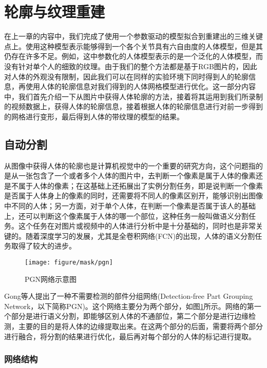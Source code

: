\newpage

\section{轮廓与纹理重建}

在上一章的内容中，我们完成了使用一个参数驱动的模型拟合到重建出的三维关键点上。使用这种模型表示能够得到一个各个关节具有六自由度的人体模型，但是其仍存在许多不足。例如，这中参数化的人体模型表示的是一个泛化的人体模型，而没有针对单个人的细致的纹理。由于我们的整个方法都是基于RGB图片的，因此对人体的外观没有限制，因此我们可以在同样的实验环境下同时得到人的轮廓信息，再使用人体的轮廓信息对我们得到的人体网格模型进行优化。这一部分内容中，我们首先介绍一下从图片中获得人体轮廓的方法，接着将其运用到我们所录制的视频数据上，获得人体的轮廓信息，接着根据人体的轮廓信息进行对前一步得到的网格进行变形，最后得到人体的带纹理的模型的结果。

\subsection{自动分割}
从图像中获得人体的轮廓也是计算机视觉中的一个重要的研究方向，这个问题指的是从一张包含了一个或者多个人体的图片中，去判断一个像素是属于人体的像素还是不属于人体的像素；在这基础上还拓展出了实例分割任务，即是说判断一个像素是否属于人体身上的像素的同时，还需要将不同人的像素区别开，能够识别出图像中不同的人体；另一方面，对于单个人体，在判断一个像素是否属于该人的基础上，还可以判断这个像素属于人体的哪一个部位，这种任务一般叫做语义分割任务。这个任务在对图片或视频中的人体进行分析中是十分基础的，同时也是非常关键的。随着深度学习的发展，尤其是全卷积网络(FCN)的出现，人体的语义分割任务取得了较大的进步。
\begin{figure}[htbp]
    \centering
    \texttt{[image: figure/mask/pgn]}
    \caption{\label{fig:pgn} PGN网络示意图\cite{cihppgn}}
\end{figure}
Gong等人\cite{cihppgn}提出了一种不需要检测的部件分组网络(Detection-free Part Grouping Network，以下简称PGN)。这个网络主要分为两个部分，如图\ref{fig:pgn}所示。网络的第一个部分是进行语义分割，即能够区别人体的不通部位，第二个部分是进行边缘检测，主要的目的是将人体的边缘提取出来。在这两个部分的后面，需要将两个部分进行融合，将分割的结果进行优化，最后再对每个部分的人体的标记进行提取。

\subsubsection{网络结构}

